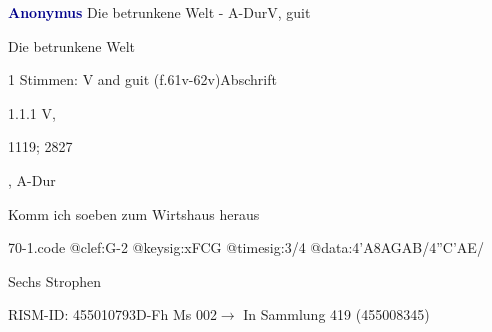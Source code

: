 \documentclass[twocolumn, 12pt]{book}
\begin{document}
\par \vspace{16pt} \textcolor{darkblue}{\textbf{Anonymus  }}\hfillplus{\textbf{[70]}}\newline Die betrunkene Welt - A-Dur\newline V, guit
\par \begin{itshape}[heading, f.61v:] Die betrunkene Welt\end{itshape} 
\par \textcolor{darkblue}{}  1 Stimmen: V and guit  (f.61v-62v)\newline Abschrift
\par 1.1.1  V, \begin{itshape}1119; 2827\end{itshape}, A-Dur\newline \begin{footnotesize} Komm ich soeben zum Wirtshaus heraus \end{footnotesize}  
\begin{filecontents*}{70-1.code}
@clef:G-2
@keysig:xFCG
@timesig:3/4
@data:4'A{8AG}{AB}/4''C'AE/
\end{filecontents*}
\newline %
\par Sechs Strophen
\par RISM-ID: 455010793\newline D-Fh  Ms 002\newline $\rightarrow$ In Sammlung 419 (455008345)
      
\end{document}
